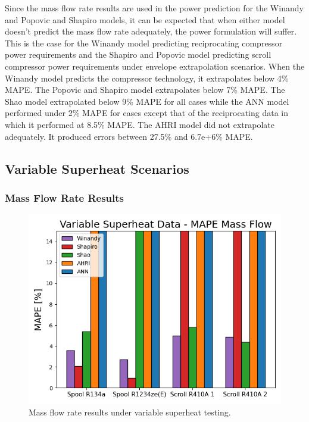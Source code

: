 \documentclass[preprint,11pt,authoryear]{elsarticle}
\begin{document}
Since the mass flow rate results are used in the power prediction for the Winandy and Popovic and Shapiro models, it can be expected that when either model doesn't predict the mass flow rate adequately, the power formulation will suffer. This is the case for the Winandy model predicting reciprocating compressor power requirements and the Shapiro and Popovic model predicting scroll compressor power requirements under envelope extrapolation scenarios. When the Winandy model predicts the compressor technology, it extrapolates below 4\% MAPE. The Popovic and Shapiro model extrapolates below 7\% MAPE. The Shao model extrapolated below 9\% MAPE for all cases while the ANN model performed under 2\% MAPE for cases except that of the reciprocating data in which it performed at 8.5\% MAPE. The AHRI model did not extrapolate adequately. It produced errors between 27.5\% and 6.7e+6\% MAPE. 

\subsection{Variable Superheat Scenarios}
\subsubsection{Mass Flow Rate Results}
\begin{figure}
\centering
\includegraphics[width=0.75\linewidth]{mdot_vspr.png}
\caption{Mass flow rate results under variable superheat testing.}
\label{fig:mdot_vspr}
\end{figure}
\FloatBarrier
\end{document}
